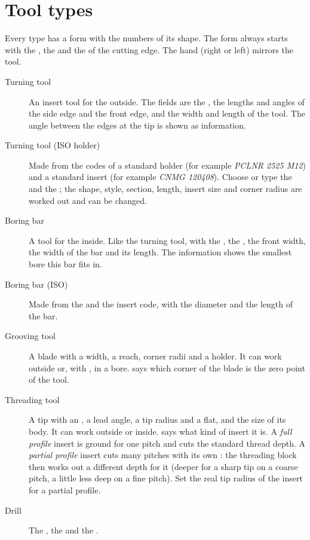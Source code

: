 \section{Tool types}\label{sec:tools:types}
Every type has a form with the numbers of its shape. The form always starts with the , the  and the  of the cutting edge. The hand (right or left) mirrors the tool.

\begin{description}
\item[Turning tool] An insert tool for the outside. The fields are the , the lengths and angles of the side edge and the front edge, and the width and length of the tool. The angle between the edges at the tip is shown as information.
\item[Turning tool (ISO holder)] Made from the codes of a standard holder (for example \emph{PCLNR 2525 M12}) and a standard insert (for example \emph{CNMG 120408}). Choose or type the  and the ; the shape, style, section, length, insert size and corner radius are worked out and can be changed.
\item[Boring bar] A tool for the inside. Like the turning tool, with the , the , the front width, the width of the bar and its length. The information shows the smallest bore this bar fits in.
\item[Boring bar (ISO)] Made from the  and the insert code, with the diameter and the length of the bar.
\item[Grooving tool] A blade with a width, a reach, corner radii and a holder. It can work outside or, with , in a bore.  says which corner of the blade is the zero point of the tool.
\item[Threading tool] A tip with an , a lead angle, a tip radius and a flat, and the size of its body. It can work outside or inside.  says what kind of insert it is. A \emph{full profile} insert is ground for one pitch and cuts the standard thread depth. A \emph{partial profile} insert cuts many pitches with its own : the threading block then works out a different depth for it (deeper for a sharp tip on a coarse pitch, a little less deep on a fine pitch). Set the real tip radius of the insert for a partial profile.
\item[Drill] The , the  and the .
\end{description}

